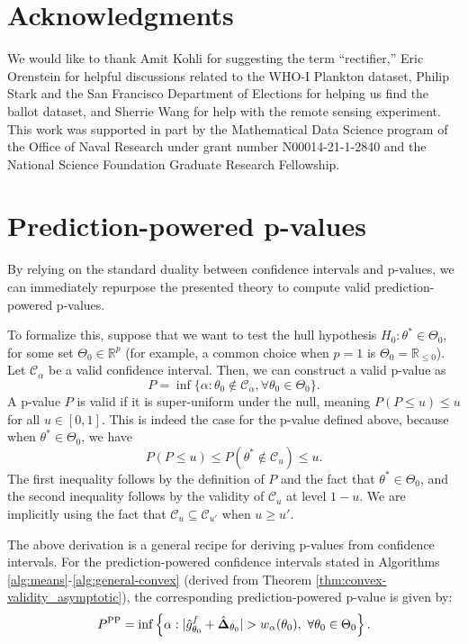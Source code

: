 \documentclass[10pt]{article}
\def\R{\mathbb{R}}
\newcommand{\C}{\mathcal{C}}
\newcommand{\rechat}{\hat{\mathbf{\Delta}}}
\begin{document}
\section{Acknowledgments}
We would like to thank Amit Kohli for suggesting the term ``rectifier,'' Eric Orenstein for helpful discussions related to the WHO-I Plankton dataset, Philip Stark and the San Francisco Department of Elections for helping us find the ballot dataset, and Sherrie Wang for help with the remote sensing experiment.
This work was supported in part by the Mathematical Data Science program of the
Office of Naval Research under grant number N00014-21-1-2840 and the National Science Foundation Graduate Research Fellowship.
\printbibliography

\clearpage
\appendix

\section{Prediction-powered p-values}

By relying on the standard duality between confidence intervals and p-values, we can immediately repurpose the presented theory to compute valid prediction-powered p-values.

To formalize this, suppose that we want to test the hull hypothesis $H_0: \theta^*\in\Theta_0$, for some set $\Theta_0 \in \R^p$ (for example, a common choice when $p=1$ is $\Theta_0 = \R_{\leq 0}$). Let $\C_\alpha$ be a valid confidence interval. Then, we can construct a valid p-value as
\begin{equation*}
P = \inf\{\alpha: \theta_0 \not\in \C_\alpha, \forall \theta_0\in\Theta_0\}.
\end{equation*}
A p-value $P$ is valid if it is super-uniform under the null, meaning $P(P \leq u)\leq u$ for all $u\in[0,1]$. This is indeed the case for the p-value defined above, because when $\theta^*\in\Theta_0$, we have
$$P(P\leq u) \leq P(\theta^* \not\in \C_u) \leq u.$$
The first inequality follows by the definition of $P$ and the fact that $\theta^*\in\Theta_0$, and the second inequality follows by the validity of $\C_u$ at level $1-u$. We are implicitly using the fact that $\C_u \subseteq \C_{u'}$ when $u\geq u'$.

The above derivation is a general recipe for deriving p-values from confidence intervals. For the prediction-powered confidence intervals stated in Algorithms \ref{alg:means}-\ref{alg:general-convex} (derived from Theorem \ref{thm:convex-validity_asymptotic}), the corresponding prediction-powered p-value is given by:
$$P^{\rm PP} = \inf\left\{\alpha: |\hat g^f_{\theta_0} + \rechat_{\theta_0}| > w_{\alpha}(\theta_0), ~\forall \theta_0\in\Theta_0 \right\}.$$
\end{document}
